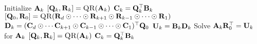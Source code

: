 
\begin{algorithmic}[1]
        \State Initialize $\mathbf{A}_k$
        \State $[\mat{Q}_k,\mat{R}_k] = \Call{QR}{\mat{A}_k}$ 
        \State $\mathbf{C}_k = \mathbf{Q}_k^\top\mathbf{B}_k$  \label{l:EXP-K-Apply} 
      \EndFor
          \State $[\mat{Q}_0,\mat{R}_0] = \Call{QR}{\mat{R}_d \odot \cdots \odot \mat{R}_{k+1} \odot \mat{R}_{k-1} \odot \cdots \odot \mat{R}_1}$ 
          \State $\mathbf{D}_k = (\mathbf{C}_d \odot \cdots \mathbf{C}_{k+1} \odot \mathbf{C}_{k-1} \odot \cdots \odot \mathbf{C}_1)^\top\mathbf{Q}_0$ 
          \State $\mathbf{U}_k = \mathbf{B}_k\mathbf{D}_k$  \label{l:EXP-mttkrp}
          \State Solve $\mathbf{A}_k\mathbf{R}_0^\top = \mathbf{U}_k$ for $\mathbf{A}_k$ 
          \State $[\mat{Q}_k,\mat{R}_k] = \Call{QR}{\mat{A}_k}$    
          \State $\mathbf{C}_k = \mathbf{Q}_k^\top\mathbf{B}_k$  \label{l:EXP-K-update-cross}   
        \EndFor
      \EndWhile
    \EndFunction
  \end{algorithmic}